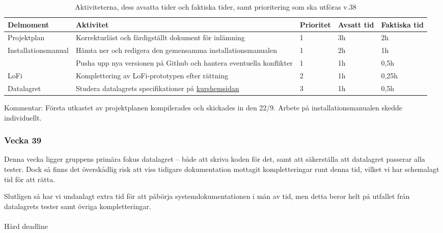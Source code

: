 \documentclass{TDP003mall}
\begin{document}
\begin{table}[h]
\begin{tabularx}{\textwidth}{|l|X|l|l|l|}
\hline
Delmoment                            & Aktivitet                                                           & Prioritet & Avsatt tid & Faktiska tid \\ \hline
Projektplan                          & Korrekturläst och färdigställt dokument för inlämning                             & 1         & 3h         & 2h           \\ \hline
\multirow{2}{*}{Installationsmanual} & Hämta ner och redigera den gemensamma installationsmanualen         & 1         & 2h         & 1h           \\ \cline{2-5}
                                     & Pusha upp nya versionen på Github och hantera eventuella konflikter & 1         & 1h         & 0,5h         \\ \hline
LoFi                                 & Komplettering av LoFi-prototypen efter rättning                     & 2         & 1h         & 0,25h        \\ \hline
Datalagret                           & Studera datalagrets specifikationer på \href{https://www.ida.liu.se/~TDP003/current/portfolio-api_python3/}{kurshemsidan}  & 3         & 1h         & 0,5h         \\ \hline
    \end{tabularx}
    \caption{\label{tab:table-name}Aktiviteterna, dess avsatta tider och faktiska tider, samt prioritering som ska utföras v.38}
\end{table}

Kommentar: Första utkastet av projektplanen kompilerades och skickades in den 22/9. Arbete på installationsmanualen skedde individuellt.

\pagebreak
\subsubsection*{Vecka 39}

Denna vecka ligger gruppens primära fokus datalagret -- både att skriva koden för det, samt att säkerställa att datalagret passerar alla tester. Dock så finns det överskådlig risk att viss tidigare dokumentation mottagit kompletteringar runt denna tid, vilket vi har schemalagt tid för att rätta.

Slutligen så har vi undanlagt extra tid för att påbörja systemdokumentationen i mån av tid, men detta beror helt på utfallet från datalagrets tester samt övriga kompletteringar.
\\
\\
Hård deadline
\end{document}
